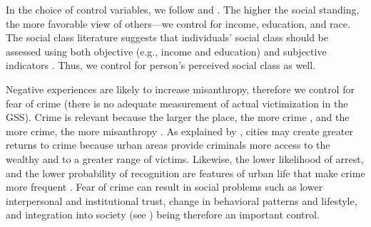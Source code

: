 \documentclass[11pt, letterpaper]{article}
\begin{document}
\begin{spacing}{1.4}
In the choice of control variables, we follow \citet{welch07} and  \citet{smith97}.
The higher the social standing, the more favorable view of others---we
control for income, education, and race. The social class literature suggests that
individuals' social class should be assessed  using both objective (e.g.,
income and education) and subjective indicators \citep[e.g.,][]{kraus09}. %
Thus, we control for person's perceived social class as well. 

Negative experiences are likely to increase misanthropy, therefore we control
for fear of crime (there is no adequate measurement of actual victimization in
the GSS). Crime is relevant because the larger the place, the more crime
\citep{bettencourt10b,wirth38,white77}, and the more crime, the more misanthropy
\citep{wilson85}. As explained by \citet{glaeser1999}, cities may create greater
returns to crime because urban areas provide criminals more access to the wealthy and to
a greater range of victims. Likewise, the lower likelihood of
arrest, and the lower probability of recognition are features of urban life that
make crime more frequent  \citep{glaeser1999}. %
 Fear of crime can result in social problems such as lower interpersonal and institutional trust, change in behavioral patterns and lifestyle, and integration into society (see \citet{krulichova2018life}) being therefore an important control. 


\end{spacing}
\end{document}

